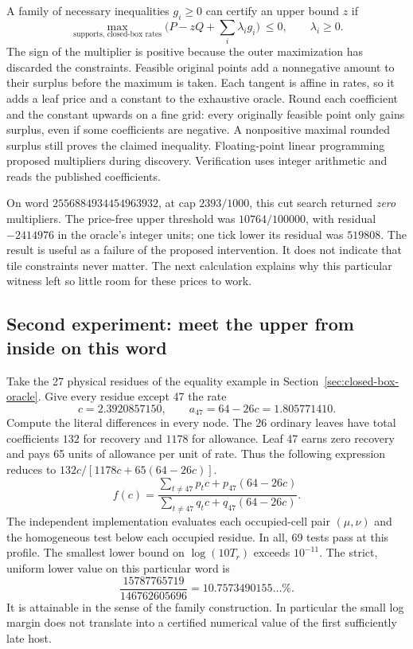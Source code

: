 A family of necessary inequalities \(g_i\ge0\) can certify an upper bound \(z\) if
\[
 \max_{\text{supports, closed-box rates}}
       \bigl(P-zQ+\sum_i\lambda_i g_i\bigr)\ \le0,\qquad \lambda_i\ge0 .
\]
The sign of the multiplier is positive because the outer maximization has discarded the constraints. Feasible original points add a nonnegative amount to their surplus before the maximum is taken. Each tangent is affine in rates, so it adds a leaf price and a constant to the exhaustive oracle. Round each coefficient and the constant upwards on a fine grid: every originally feasible point only gains surplus, even if some coefficients are negative. A nonpositive maximal rounded surplus still proves the claimed inequality. Floating-point linear programming proposed multipliers during discovery. Verification uses integer arithmetic and reads the published coefficients.

On word \(2556884934454963932\), at cap \(2393/1000\), this cut search returned \emph{zero} multipliers. The price-free upper threshold was \(10764/100000\), with residual \(-2414976\) in the oracle's integer units; one tick lower its residual was \(519808\). The result is useful as a failure of the proposed intervention. It does not indicate that tile constraints never matter. The next calculation explains why this particular witness left so little room for these prices to work.

\subsection{Second experiment: meet the upper from inside on this word}
Take the 27 physical residues of the equality example in Section~\ref{sec:closed-box-oracle}. Give every residue except 47 the rate
\[
 c=2.3920857150,\qquad a_{47}=64-26c=1.805771410.
\]
Compute the literal differences in every node. The 26 ordinary leaves have total coefficients \(132\) for recovery and \(1178\) for allowance. Leaf 47 earns zero recovery and pays 65 units of allowance per unit of rate. Thus the following expression reduces to \(132c/[1178c+65(64-26c)]\).
\[
 f(c)=\frac{\sum_{t\ne47}p_t c+p_{47}(64-26c)}
            {\sum_{t\ne47}q_t c+q_{47}(64-26c)} .
\]
The independent implementation evaluates each occupied-cell pair \((\mu,\nu)\) and the homogeneous test below each occupied residue. In all, 69 tests pass at this profile. The smallest lower bound on \(\log(10T_r)\) exceeds \(10^{-11}\). The strict, uniform lower value on this particular word is
\[
 \frac{15787765719}{146762605696}=10.7573490155\ldots\%.
\]
It is attainable in the sense of the family construction. In particular the small log margin does not translate into a certified numerical value of the first sufficiently late host.

